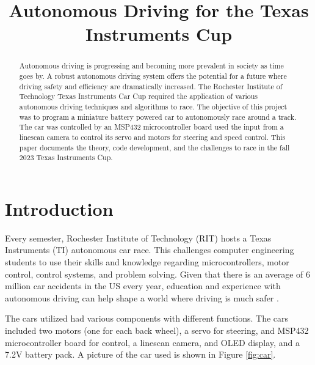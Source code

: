 \documentclass[conference]{IEEEtran}
\begin{document}
\title{Autonomous Driving for the Texas Instruments Cup}

\author{
\and
{}
}

\maketitle

\begin{abstract}
Autonomous driving is progressing and becoming more prevalent in society as time goes by. A robust autonomous driving system offers the potential for a future where driving safety and efficiency are dramatically increased. The Rochester Institute of Technology Texas Instruments Car Cup required the application of various autonomous driving techniques and algorithms to race. The objective of this project was to program a miniature battery powered car to autonomously race around a track. The car was controlled by an MSP432 microcontroller board used the input from a linescan camera to control its servo and motors for steering and speed control. This paper documents the theory, code development, and the challenges to race in the fall 2023 Texas Instruments Cup.
\end{abstract}

\section{Introduction}
Every semester, Rochester Institute of Technology (RIT) hosts a Texas Instruments (TI) autonomous car race. This challenges computer engineering students to use their skills and knowledge regarding microcontrollers, motor control, control systems, and problem solving. Given that there is an average of 6 million car accidents in the US every year, education and experience with autonomous driving can help shape a world where driving is much safer \cite{accidentStats}.

The cars utilized had various components with different functions. The cars included two motors (one for each back wheel), a servo for steering, and MSP432 microcontroller board for control, a linescan camera, and OLED display, and a 7.2V battery pack. A picture of the car used is shown in Figure \ref{fig:car}.
\end{document}
